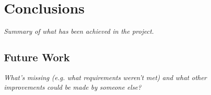 \documentclass[authoryearcitations]{UoYCSproject}
\begin{document}
\chapter{Conclusions}
\label{cha:Conclusions}

\emph{Summary of what has been achieved in the project.}


\section{Future Work}
\label{sec:FutureWork}

\emph{What's missing (e.g. what requirements weren't met) and what other
improvements could be made by someone else?}

\clearpage



\end{document}
